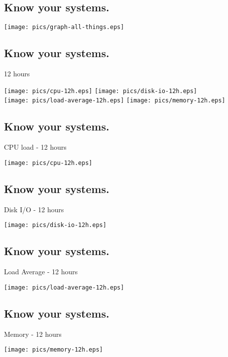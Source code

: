 \documentclass[xga]{xdvislides}
\begin{document}
\subsection{Know your systems.}
\begin{center}
	\texttt{[image: pics/graph-all-things.eps]}
\end{center}

\subsection{Know your systems.}
12 hours
\begin{center}
	\texttt{[image: pics/cpu-12h.eps]}
	\texttt{[image: pics/disk-io-12h.eps]} \\
	\texttt{[image: pics/load-average-12h.eps]}
	\texttt{[image: pics/memory-12h.eps]} \\
\end{center}

\subsection{Know your systems.}
CPU load - 12 hours
\begin{center}
	\texttt{[image: pics/cpu-12h.eps]}
\end{center}

\subsection{Know your systems.}
Disk I/O - 12 hours
\begin{center}
	\texttt{[image: pics/disk-io-12h.eps]}
\end{center}

\subsection{Know your systems.}
Load Average - 12 hours
\begin{center}
	\texttt{[image: pics/load-average-12h.eps]}
\end{center}

\subsection{Know your systems.}
Memory - 12 hours
\begin{center}
	\texttt{[image: pics/memory-12h.eps]}
\end{center}
\end{document}
